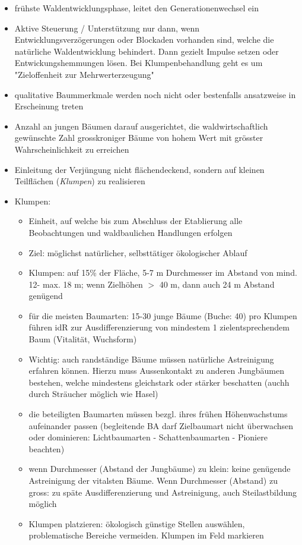 \documentclass{article}
\begin{document}
\begin{itemize}

  \item frühste Waldentwicklungsphase, leitet den Generationenwechsel ein
  
  \item Aktive Steuerung / Unterstützung nur dann, wenn Entwicklungsverzögerungen oder Blockaden vorhanden sind, welche die natürliche Waldentwicklung behindert. Dann gezielt Impulse setzen oder Entwickungshemmungen lösen. Bei Klumpenbehandlung geht es um "Zieloffenheit zur Mehrwerterzeugung"
    
  \item qualitative Baummerkmale werden noch nicht oder bestenfalls ansatzweise in Erscheinung treten
  
  \item Anzahl an jungen Bäumen darauf ausgerichtet, die waldwirtschaftlich gewünschte Zahl grosskroniger Bäume von hohem Wert mit grösster Wahrscheinlichkeit zu erreichen
  
  \item Einleitung der Verjüngung nicht flächendeckend, sondern auf kleinen Teilflächen (\textit{Klumpen}) zu realisieren
  
  \item Klumpen:
  
    \begin{itemize}
      \item Einheit, auf welche bis zum Abschluss der Etablierung alle Beobachtungen und waldbaulichen Handlungen erfolgen
      \item Ziel: möglichst natürlicher, selbsttätiger ökologischer Ablauf
      \item Klumpen: auf 15\% der Fläche, 5-7 m Durchmesser im Abstand von mind. 12- max. 18 m; wenn Zielhöhen $>$ 40 m, dann auch 24 m Abstand genügend 
  	  \item für die meisten Baumarten: 15-30 junge Bäume (Buche: 40) pro Klumpen führen idR zur Ausdifferenzierung von mindestem 1 zielentsprechendem Baum (Vitalität, Wuchsform)
  	  \item Wichtig: auch randständige Bäume müssen natürliche Astreinigung erfahren können. Hierzu muss Aussenkontakt zu anderen Jungbäumen bestehen, welche mindestens gleichstark oder stärker beschatten (auchh durch Sträucher möglich wie Hasel)
  	  \item die beteiligten Baumarten müssen bezgl. ihres frühen Höhenwachstums aufeinander passen (begleitende BA darf Zielbaumart nicht überwachsen oder dominieren: Lichtbaumarten - Schattenbaumarten - Pioniere beachten)
  	  \item wenn Durchmesser (Abstand der Jungbäume) zu klein: keine genügende Astreinigung der vitalsten Bäume. Wenn Durchmesser (Abstand) zu gross: zu späte Ausdifferenzierung und Astreinigung, auch Steilastbildung möglich 
  	  \item Klumpen platzieren: ökologisch günstige Stellen auswählen, problematische Bereiche vermeiden. Klumpen im Feld markieren
    \end{itemize}
  

\end{itemize}
\end{document}
